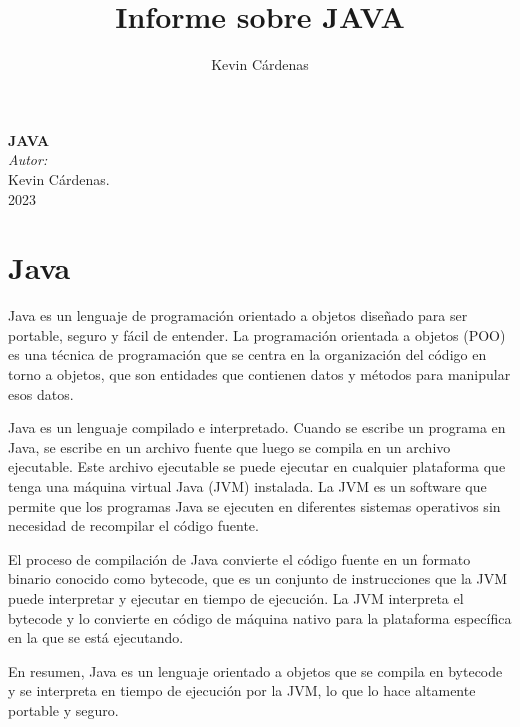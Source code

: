 \documentclass[executivepaper]{article}
\title{Informe sobre JAVA}
\author{Kevin Cárdenas}
\begin{document}
\begin{titlepage}
    \begin{center}
        {\Huge \textbf{JAVA}}
        \\[18cm]

        \large\emph{Autor:}\\
        Kevin Cárdenas.
        \\[1cm]
        {\large 2023}
    \end{center}
\end{titlepage}

\newpage
\tableofcontents
\newpage
\section{Java}
Java es un lenguaje de programación orientado a objetos diseñado para ser portable, seguro y fácil de entender. La programación orientada a objetos (POO) es una técnica de programación que se centra en la organización del código en torno a objetos, que son entidades que contienen datos y métodos para manipular esos datos.

Java es un lenguaje compilado e interpretado. Cuando se escribe un programa en Java, se escribe en un archivo fuente que luego se compila en un archivo ejecutable. Este archivo ejecutable se puede ejecutar en cualquier plataforma que tenga una máquina virtual Java (JVM) instalada. La JVM es un software que permite que los programas Java se ejecuten en diferentes sistemas operativos sin necesidad de recompilar el código fuente.

El proceso de compilación de Java convierte el código fuente en un formato binario conocido como bytecode, que es un conjunto de instrucciones que la JVM puede interpretar y ejecutar en tiempo de ejecución. La JVM interpreta el bytecode y lo convierte en código de máquina nativo para la plataforma específica en la que se está ejecutando.

En resumen, Java es un lenguaje orientado a objetos que se compila en bytecode y se interpreta en tiempo de ejecución por la JVM, lo que lo hace altamente portable y seguro.
\end{document}
